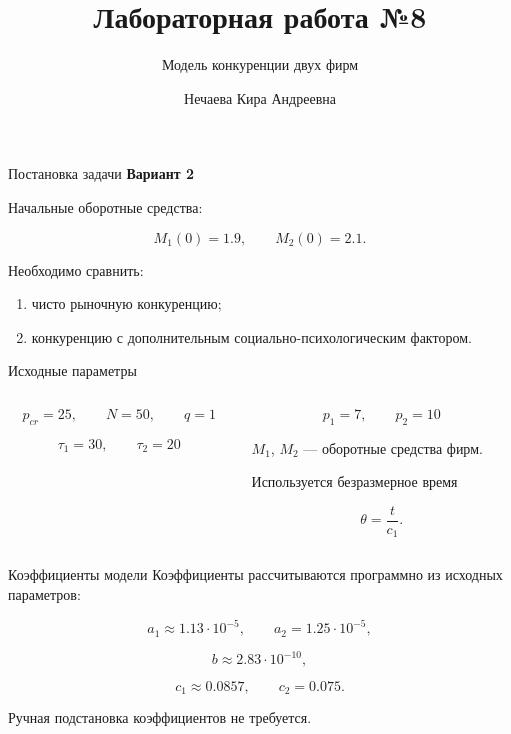 \documentclass[
  10pt,
  ignorenonframetext,
  aspectratio=169,
  russian,
]{beamer}
\title{\texorpdfstring{Лабораторная работа №8}{Лабораторная работа №8}}
\subtitle{\texorpdfstring{Модель конкуренции двух
фирм}{Модель конкуренции двух фирм}}
\author{Нечаева Кира Андреевна}
\date{}
\institute{НКНбд-01-23}
\providecommand{\tightlist}{%
  \setlength{\itemsep}{0pt}\setlength{\parskip}{0pt}}
\begin{document}
\frame{\titlepage}


\begin{frame}{Постановка задачи}
\protect{}\label{ux43fux43eux441ux442ux430ux43dux43eux432ux43aux430-ux437ux430ux434ux430ux447ux438}
\textbf{Вариант 2}

Начальные оборотные средства:

\[
M_1(0)=1.9,
\qquad
M_2(0)=2.1.
\]

Необходимо сравнить:

\begin{enumerate}
\tightlist
\item
  чисто рыночную конкуренцию;
\item
  конкуренцию с дополнительным социально-психологическим фактором.
\end{enumerate}
\end{frame}

\begin{frame}{Исходные параметры}
\protect{}\label{ux438ux441ux445ux43eux434ux43dux44bux435-ux43fux430ux440ux430ux43cux435ux442ux440ux44b}
\begin{columns}[T]
\begin{column}{0.5\linewidth}
\[
p_{cr}=25,
\qquad
N=50,
\qquad
q=1
\]

\[
\tau_1=30,
\qquad
\tau_2=20
\]
\end{column}

\begin{column}{0.5\linewidth}
\[
p_1=7,
\qquad
p_2=10
\]

\(M_1\), \(M_2\) --- оборотные средства фирм.

Используется безразмерное время

\[
\theta=\frac{t}{c_1}.
\]
\end{column}
\end{columns}
\end{frame}

\begin{frame}{Коэффициенты модели}
\protect{}\label{ux43aux43eux44dux444ux444ux438ux446ux438ux435ux43dux442ux44b-ux43cux43eux434ux435ux43bux438}
Коэффициенты рассчитываются программно из исходных параметров:

\[
a_1\approx1.13\cdot10^{-5},
\qquad
a_2=1.25\cdot10^{-5},
\]

\[
b\approx2.83\cdot10^{-10},
\]

\[
c_1\approx0.0857,
\qquad
c_2=0.075.
\]

Ручная подстановка коэффициентов не требуется.
\end{frame}
\end{document}
